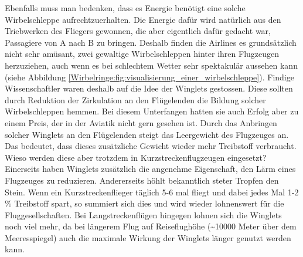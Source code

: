 Ebenfalls muss man bedenken, dass es Energie benötigt eine solche Wirbelschleppe aufrechtzuerhalten.
Die Energie dafür wird natürlich aus den Triebwerken des Fliegers gewonnen, die aber eigentlich dafür gedacht war, Passagiere von A nach B zu bringen.
Deshalb finden die Airlines es grundsätzlich nicht sehr amüsant, zwei gewaltige Wirbelschleppen hinter ihren Flugzeugen herzuziehen, auch wenn es bei schlechtem Wetter sehr spektakulär aussehen kann (siehe Abbildung \ref{Wirbelringe:fig:visualisierung_einer_wirbelschleppe}). 
Findige Wissenschaftler waren deshalb auf die Idee der Winglets gestossen.
Diese sollten durch Reduktion der Zirkulation an den Flügelenden die Bildung solcher Wirbelschleppen hemmen.
Bei diesem Unterfangen hatten sie auch Erfolg aber zu einem Preis, der in der Aviatik nicht gern gesehen ist.
Durch das Anbringen solcher Winglets an den Flügelenden steigt das Leergewicht des Flugzeuges an.
Das bedeutet, dass dieses zusätzliche Gewicht wieder mehr Treibstoff verbraucht.
Wieso werden diese aber trotzdem in Kurzstreckenflugzeugen eingesetzt?
Einerseits haben Winglets zusätzlich die angenehme Eigenschaft, den Lärm eines Flugzeuges zu reduzieren.
Andererseits höhlt bekanntlich steter Tropfen den Stein.
Wenn ein Kurzstreckenflieger täglich 5-6 mal fliegt und dabei jedes Mal 1-2 \% Treibstoff spart, so summiert sich dies und wird wieder lohnenswert für die Fluggesellschaften.
Bei Langstreckenflügen hingegen lohnen sich die Winglets noch viel mehr, da bei längerem Flug auf Reiseflughöhe (\textasciitilde10000 Meter über dem Meeresspiegel) auch die maximale Wirkung der Winglets länger genutzt werden kann.
